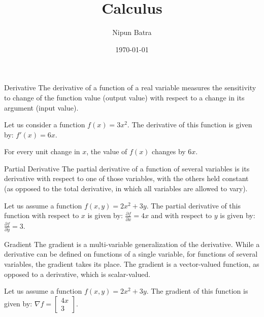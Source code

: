 \documentclass[handout]{beamer}
\begin{document}
\title{Calculus}
\author{Nipun Batra}
\date{\today}
\maketitle

\begin{frame}{Derivative}
The derivative of a function of a real variable measures the sensitivity to change of the function value (output value) with respect to a change in its argument (input value). 

Let us consider a function $f(x) = 3x^2$. The derivative of this function is given by: $f'(x) = 6x$.

For every unit change in $x$, the value of $f(x)$ changes by $6x$.
    
\end{frame}

\begin{frame}{Partial Derivative}
The partial derivative of a function of several variables is its derivative with respect to one of those variables, with the others held constant (as opposed to the total derivative, in which all variables are allowed to vary).

Let us assume a function $f(x,y) = 2x^2 + 3y$. The partial derivative of this function with respect to $x$ is given by: $\frac{\partial f}{\partial x} = 4x$ and with respect to $y$ is given by: $\frac{\partial f}{\partial y} = 3$.

\end{frame}

\begin{frame}{Gradient}
The gradient is a multi-variable generalization of the derivative. While a derivative can be defined on functions of a single variable, for functions of several variables, the gradient takes its place. The gradient is a vector-valued function, as opposed to a derivative, which is scalar-valued.

Let us assume a function $f(x,y) = 2x^2 + 3y$. The gradient of this function is given by: $\nabla f = \begin{bmatrix} 4x \\ 3 \end{bmatrix}$.
    
\end{frame}
\end{document}
